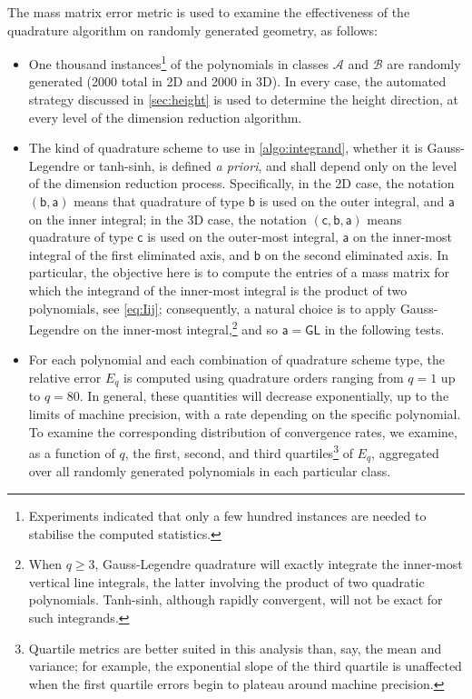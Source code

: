 \documentclass[onefignum,onetabnum,onealgnum,oneeqnum]{siamart190516}
\begin{document}
The mass matrix error metric is used to examine the effectiveness of the quadrature algorithm on randomly generated geometry, as follows:
\begin{itemize}
\item One thousand instances\footnote{Experiments indicated that only a few hundred instances are needed to stabilise the computed statistics.}  of the polynomials in classes $\mathcal A$ and $\mathcal B$ are randomly generated (2000 total in 2D and 2000 in 3D). In every case, the automated strategy discussed in \cref{sec:height} is used to determine the height direction, at every level of the dimension reduction algorithm.
\item The kind of quadrature scheme to use in \cref{algo:integrand}, whether it is Gauss-Legendre or tanh-sinh, is defined \textit{a priori}, and shall depend only on the level of the dimension reduction process. Specifically, in the 2D case, the notation $(\mathsf{b},\mathsf{a})$ means that quadrature of type $\mathsf{b}$ is used on the outer integral, and $\mathsf a$ on the inner integral; in the 3D case, the notation $(\mathsf c, \mathsf b, \mathsf a)$ means quadrature of type $\mathsf c$ is used on the outer-most integral, $\mathsf a$ on the inner-most integral of the first eliminated axis, and $\mathsf b$ on the second eliminated axis. In particular, the objective here is to compute the entries of a mass matrix for which the integrand of the inner-most integral is the product of two polynomials, see \eqref{eq:Iij}; consequently, a natural choice is to apply Gauss-Legendre on the inner-most integral,\footnote{When $q \geq 3$, Gauss-Legendre quadrature will exactly integrate the inner-most vertical line integrals, the latter involving the product of two quadratic polynomials. Tanh-sinh, although rapidly convergent, will not be exact for such integrands.} and so $\mathsf a = \mathsf{GL}$ in the following tests.



%

%

\item For each polynomial and each combination of quadrature scheme type, the relative error $E_q$ is computed using quadrature orders ranging from $q = 1$ up to $q = 80$. In general, these quantities will decrease exponentially, up to the limits of machine precision, with a rate depending on the specific polynomial. To examine the corresponding distribution of convergence rates, we examine, as a function of $q$, the first, second, and third quartiles\footnote{Quartile metrics are better suited in this analysis than, say, the mean and variance; for example, the exponential slope of the third quartile is unaffected when the first quartile errors begin to plateau around machine precision.} of $E_q$, aggregated over all randomly generated polynomials in each particular class. %
\end{itemize}
\end{document}
